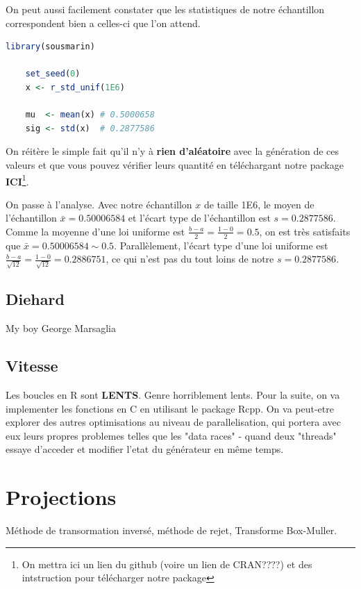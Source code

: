 \documentclass[10pt]{article} %
\begin{document}
On peut aussi facilement constater que les statistiques de notre échantillon correspondent bien a celles-ci que l'on attend.

\begin{lstlisting}[language=R]
    library(sousmarin)

    set_seed(0)
    x <- r_std_unif(1E6)

    mu  <- mean(x) # 0.5000658
    sig <- std(x)  # 0.2877586
\end{lstlisting}

On réitère le simple fait qu'il n'y à \textbf{rien d'aléatoire} avec la génération de ces valeurs et que vous pouvez vérifier leurs quantité en
téléchargant notre package \textbf{ICI}\footnote{On mettra ici un lien du github (voire un lien de CRAN????) et des intstruction pour télécharger notre package}.

On passe à l'analyse. Avec notre échantillon $x$ de taille 1E6, le moyen de l'échantillon $\bar x = 0.50006584$ et l'écart type de l'échantillon est $s = 0.2877586$.
Comme la moyenne d'une loi uniforme est $\frac{b - a}{2} = \frac{1 - 0}{2} = 0.5$, on est très satisfaits que $\bar x = 0.50006584 \sim 0.5$. Parallèlement, l'écart type
d'une loi uniforme est $\frac{b - a}{\sqrt{12}} = \frac{1 - 0}{\sqrt{12}} = 0.2886751$, ce qui n'est pas du tout loins de notre $s = 0.2877586$.

\subsection{Diehard}

My boy George Marsaglia

\subsection{Vitesse}

Les boucles en R sont \textbf{LENTS}. Genre horriblement lents. Pour la suite, on va implementer les fonctions en C en utilisant le package Rcpp. On va peut-etre
explorer des autres optimisations au niveau de parallelisation, qui portera avec eux leurs propres problemes telles que les "data races" - quand deux "threads" essaye d'acceder et
modifier l'etat du générateur en même temps.

\section{Projections}

Méthode de transormation inversé, méthode de rejet, Transforme Box-Muller.
\end{document}

